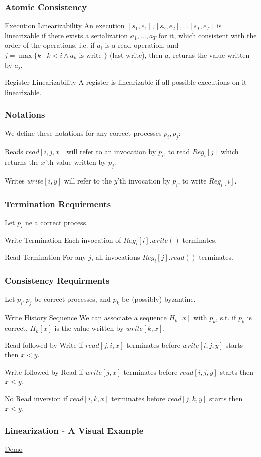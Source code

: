 \begin{frame}
    \frametitle{Atomic Consistency}
    \begin{block}{Execution Linearizability}
        An execution $[s_1, e_1], [s_2, e_2], ... [s_T, e_T]$
        is linearizable if there exists a serialization $a_1,...,a_T$ for it,
        which consistent with the order of the operations, i.e.
        if $a_i$ is a read operation, and $j=\max\{k\mid k<i\wedge a_k\text{ is write }\}$ (last write),
        then $a_i$ returns the value written by $a_j$.
    \end{block}
    \begin{alertblock}{Register Linearizability}
        A register is linearizable if all possible executions on it linearizable.
    \end{alertblock}
\end{frame}
\begin{frame}
    \frametitle{Notations}
    We define these notations for any correct processes $p_i, p_j$:
    \begin{block}{Reads}
        $read[i,j,x]$ will refer to an invocation by $p_i$, to read $Reg_i[j]$
        which returns the $x$'th value written by $p_j$.
    \end{block}
    \begin{block}{Writes}
        $write[i,y]$ will refer to the $y$'th invocation by $p_i$, to write $Reg_i[i]$.
    \end{block}

\end{frame}
\begin{frame}
    \frametitle{Termination Requirments}
    Let $p_i$ ne a correct process.
    \begin{block}{Write Termination}
        Each invocation of $Reg_i[i].write()$ terminates.
    \end{block}
    \begin{block}{Read Termination}
        For any $j$, all invocations $Reg_i[j].read()$ terminates.
    \end{block}
\end{frame}
\begin{frame}
    \frametitle{Consistency Requirments}
    Let $p_i, p_j$ be correct processes, and $p_k$ be (possibly) byzantine.
    \begin{block}{Write History Sequence}
        We can associate a sequence $H_k[x]$ with $p_k$, s.t. if $p_k$ is correct,
        $H_k[x]$ is the value written by $write[k,x]$.
    \end{block}
    \begin{block}{Read followed by Write}
        if $read[j,i,x]$ terminates before $write[i,j,y]$ starts then $x<y$.
    \end{block}
    \begin{block}{Write followed by Read}
        if $write[j,x]$ terminates before $read[i,j,y]$ starts then $x\leq y$.
    \end{block}
    \begin{block}{No Read inversion}
        if $read[i,k,x]$ terminates before $read[j,k,y]$ starts then $x\leq y$.
    \end{block}    
\end{frame}

\begin{frame}
    \frametitle{Linearization - A Visual Example}
    \begin{center}
        \href{https://www.desmos.com/calculator/pxwg2kg8xf}{Demo}
    \end{center}
\end{frame}